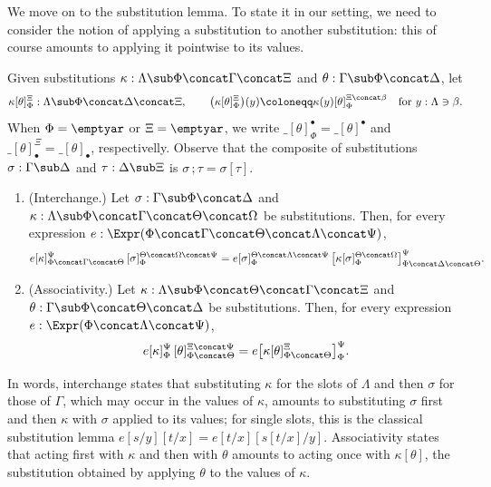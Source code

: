 We move on to the substitution lemma. To state it in our setting, we need to consider the notion of applying a substitution to another substitution: this of course amounts to applying it pointwise to its values.

\begin{definition} 
    Given substitutions $\kappa : \Lambda \sub \Phi \concat \Gamma \concat \Xi$ and $\theta : \Gamma \sub \Phi \concat \Delta$, let
    \[
        \kappa[\theta]_\Phi^\Xi : \Lambda \sub \Phi \concat \Delta \concat \Xi, \qquad
        \big(\kappa[\theta]_\Phi^\Xi\big)(y) \coloneqq \kappa(y)[\theta]_\Phi^{\Xi \concat \beta} \quad \text{for } y : \Lambda \ni \beta.
        \]
        When $\Phi = \emptyar$ or $\Xi = \emptyar$, we write $\_[\theta]_{\Phi}^{\bullet} = \_[\theta]^{\bullet}$ and $\_[\theta]^{\Xi}_{\bullet} = \_[\theta]_{\bullet}$, respectivelly. Observe that the composite of substitutions $\sigma : \Gamma \sub \Delta$ and $\tau : \Delta \sub \Xi$ is $\sigma \,; \tau = \sigma[\tau]$.
\end{definition}
        
\begin{lemma}\label{lem:substitution}
    \begin{enumerate}
        \item (Interchange.) Let $\sigma : \Gamma \sub \Phi \concat \Delta$ and $\kappa : \Lambda \sub \Phi \concat \Gamma \concat \Theta \concat \Omega$ be substitutions. Then, for every expression $e : \Expr(\Phi \concat \Gamma \concat \Theta \concat \Lambda \concat \Psi)$,
        \[
        e[\kappa]_{\Phi \concat \Gamma \concat \Theta}^{\Psi}\,[\sigma]_\Phi^{\Theta \concat \Omega \concat \Psi}
        = e[\sigma]_\Phi^{\Theta \concat \Lambda \concat \Psi}\,\big[\kappa[\sigma]_\Phi^{\Theta \concat \Omega}\big]_{\Phi \concat \Delta \concat \Theta}^{\Psi}.
        \]
        \item (Associativity.) Let $\kappa : \Lambda \sub \Phi \concat \Theta \concat \Gamma \concat \Xi$ and $\theta : \Gamma \sub \Phi \concat \Theta \concat \Delta$ be substitutions. Then, for every expression $e : \Expr(\Phi \concat \Lambda \concat \Psi)$,
        \[
        e[\kappa]_\Phi^\Psi\,[\theta]_{\Phi \concat \Theta}^{\Xi \concat \Psi}
        = e\big[\kappa[\theta]_{\Phi \concat \Theta}^{\Xi}\big]_\Phi^\Psi.
        \]
    \end{enumerate}
\end{lemma}

In words, interchange states that substituting $\kappa$ for the slots of $\Lambda$ and then $\sigma$ for those of $\Gamma$, which may occur in the values of $\kappa$, amounts to substituting $\sigma$ first and then $\kappa$ with $\sigma$ applied to its values; for single slots, this is the classical substitution lemma $e[s/y][t/x] = e[t/x][s[t/x]/y]$. Associativity states that acting first with $\kappa$ and then with $\theta$ amounts to acting once with $\kappa[\theta]$, the substitution obtained by applying $\theta$ to the values of $\kappa$.

